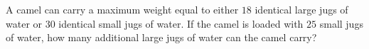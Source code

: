 A camel can carry a maximum weight equal to either $18$ identical large jugs of water or $30$ identical small jugs of water. If the camel is loaded with $25$ small jugs of water, how many additional large jugs of water can the camel carry?
